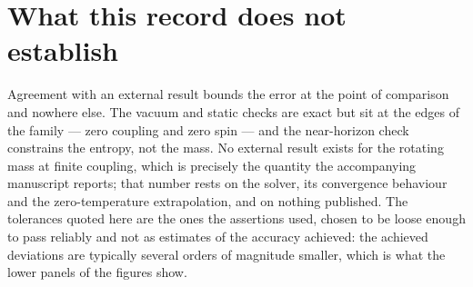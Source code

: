 \documentclass[11pt,a4paper]{article}
\begin{document}
\section*{What this record does not establish}

Agreement with an external result bounds the error at the point of comparison
and nowhere else. The vacuum and static checks are exact but sit at the edges of
the family --- zero coupling and zero spin --- and the near-horizon check
constrains the entropy, not the mass. No external result exists for the rotating
mass at finite coupling, which is precisely the quantity the accompanying
manuscript reports; that number rests on the solver, its convergence behaviour
and the zero-temperature extrapolation, and on nothing published. The tolerances
quoted here are the ones the assertions used, chosen to be loose enough to pass
reliably and not as estimates of the accuracy achieved: the achieved deviations
are typically several orders of magnitude smaller, which is what the lower
panels of the figures show.
\end{document}
